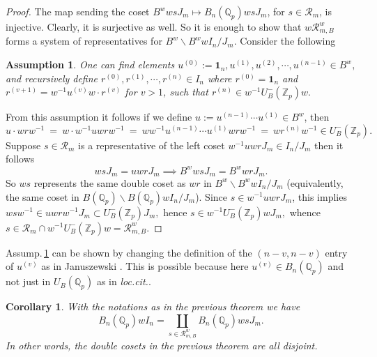 \documentclass[11pt]{amsart}
\newtheorem{corollary}{Corollary}[section]
\newtheorem{ass}{Assumption}[section]
\begin{document}
\begin{proof}
The map sending the coset $B^w w s J_m \mapsto B_n(\mathbb{Q}_p) w s J_m$, for 
$s \in \mathcal{R}_m$, is injective. Clearly, it is surjective as well. So it is enough to show that $w \mathcal{R}_{m,B}^w$ forms a system of representatives for 
$B^w\backslash B^w w I_n/ J_m.$ Consider the following
\begin{ass}
\label{ass} 
	One can find elements $u^{(0)} := \mathbf{1}_n, u^{(1)}, u^{(2)}, \cdots , u^{(n-1)} \in B^w,$ and recursively define 
	$r^{(0)}, r^{(1)}, \cdots, r^{(n)} \in I_n$ where $r^{(0)} = \mathbf{1}_n$ and $r^{(v+1)} = w^{-1}u^{(v)}w \cdot r^{(v)}$ for $v > 1$, 
	such that $r^{(n)} \in w^{-1}U_B^{-}(\mathbb{Z}_p)w.$ 
\end{ass}	
From this assumption it follows if we define $u := u^{(n-1)} \cdots u^{(1)} \in B^w$, then
$$
u \cdot w r w^{-1} \ = \ w \cdot w^{-1} u wr w^{-1} 
\ = \ 
w w^{-1} u^{(n-1)} \cdots u^{(1)} w r w^{-1}
\ = \ 
w r^{(n)} w^{-1} \in U_B^{-}(\mathbb{Z}_p).
$$
Suppose $s \in \mathcal{R}_m$ is a representative of the left coset $w^{-1}u w r J_m \in I_n / J_m$ then it follows 
	\[  wsJ_m = u wr J_m \implies B^w ws J_m = B^w wr J_m.\]
So $ws$ represents the same double coset as $wr$ in $B^w \backslash B^w wI_n/ J_m$ (equivalently, the same coset in $B(\mathbb{Q}_p)\backslash B(\mathbb{Q}_p)wI_n/ J_m$). 
Since $s \in w^{-1}u w r J_m$, this implies
$wsw^{-1} \in u w r w^{-1} J_m \subset U_B^{-}(\mathbb{Z}_p)J_m,$ hence 
$s \in w^{-1}U_B^{-}(\mathbb{Z}_p)w J_m,$ whence 
$s \in \mathcal{R}_m \cap w^{-1} U_B^{-}(\mathbb{Z}_p) w = \mathcal{R}_{m,B}^w.$
\end{proof}

Assump.\,\ref{ass} can be shown by changing the definition of the $(n-v, n-v)$ entry of $u^{(v)}$ as in 
Januszewski \cite[Prop.\,2.2]{fabian}. This is possible because here $u^{(v)} \in B_n(\mathbb{Q}_p)$ and not just in $U_B(\mathbb{Q}_p)$ as in \textit{loc.cit.}.


\begin{corollary} \label{corollary: coser-rep-disjoint}
	With the notations as in the previous theorem we have
	\[B_n(\mathbb{Q}_p)wI_n = \coprod_{s \in \mathcal{R}_{m,B}^w} B_n(\mathbb{Q}_p)w s J_m. \]
	In other words, the double cosets in the previous theorem are all disjoint.
\end{corollary}
\end{document}
